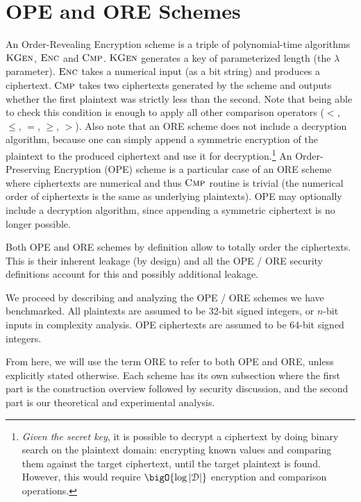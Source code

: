 \section{OPE and ORE Schemes}

	An Order-Revealing Encryption scheme is a triple of polynomial\hyp{}time algorithms $\textsc{KGen}$, $\textsc{Enc}$ and $\textsc{Cmp}$.
	$\textsc{KGen}$ generates a key of parameterized length (the $\lambda$ parameter).
	$\textsc{Enc}$ takes a numerical input (as a bit string) and produces a ciphertext.
	$\textsc{Cmp}$ takes two ciphertexts generated by the scheme and outputs whether the first plaintext was strictly less than the second.
	Note that being able to check this condition is enough to apply all other comparison operators ($<$, $\le$, $=$, $\ge$, $>$).
	Also note that an ORE scheme does not include a decryption algorithm, because one can simply append a symmetric encryption of the plaintext to the produced ciphertext and use it for decryption.\footnote{
		\emph{Given the secret key}, it is possible to decrypt a ciphertext by doing binary search on the plaintext domain: encrypting known values and comparing them against the target ciphertext, until the target plaintext is found.
		However, this would require $\bigO{\log{|\domain|}}$ encryption and comparison operations.
	}
	An Order-Preserving Encryption (OPE) scheme is a particular case of an ORE scheme where ciphertexts are numerical and thus $\textsc{Cmp}$ routine is trivial (the numerical order of ciphertexts is the same as underlying plaintexts).
	OPE may optionally include a decryption algorithm, since appending a symmetric ciphertext is no longer possible.

	Both OPE and ORE schemes by definition allow to totally order the ciphertexts.
	This is their inherent leakage (by design) and all the OPE / ORE security definitions account for this and possibly additional leakage.

	We proceed by describing and analyzing the OPE / ORE schemes we have benchmarked.
	All plaintexts are assumed to be 32-bit signed integers, or $n$-bit inputs in complexity analysis.
	OPE ciphertexts are assumed to be 64-bit signed integers.

	From here, we will use the term ORE to refer to both OPE and ORE, unless explicitly stated otherwise.
	Each scheme has its own subsection where the first part is the construction overview followed by security discussion, and the second part is our theoretical and experimental analysis.

	

